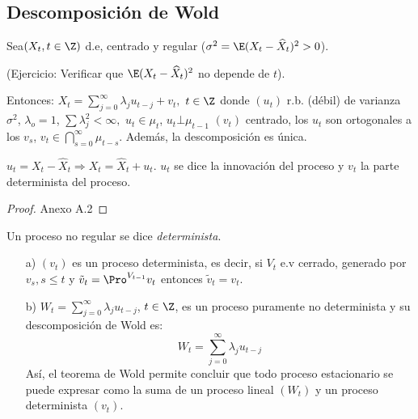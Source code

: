 \subsection{Descomposici\'{o}n de Wold}
\label{subsubsec:mylabel4}

\begin{teorema}
Sea$(X_{t} ,t\in \Z)$ d.e, centrado y regular ($ {\sigma^{2}=\E( {X_{t} -\widehat{{X}}_{t} } )^{2}>0} $).\newline

(Ejercicio: Verificar que $\E( {X_{t} -\widehat{{X}}_{t} } )^{2}$ no depende de $t$).\newline 

Entonces: $\displaystyle X_{t} =\sum_{j=0}^\infty {\lambda_{j} u_{t-j} +v_{t} },$ $t\in \Z$
donde $(u_{t} )$ r.b. (d\'{e}bil) de varianza $\sigma^{2}$, $\lambda_{o} =1$, $\sum {\lambda_{j}^{2} <\infty },$ $u_{t} \in \mu_{t}$, $u_{t} \bot \mu_{t-1}$ $(v_{t})$ centrado, los $u_{t}$ son ortogonales a los $v_{s}$, $\displaystyle v_{t} \in \bigcap_{s=0}^{\infty } \mu_{t-s} $. Adem\'{a}s, la descomposici\'{o}n es \'{u}nica.
\end{teorema}

\begin{observacion}
$u_{t} =X_{t} -\widehat{{X}}_{t} \Rightarrow X_{t} =\widehat{{X}}_{t} +u_{t}.$ $ u_{t} $ se dice la innovaci\'{o}n del proceso y $v_{t}$ la parte determinista del proceso.
\end{observacion}

\begin{proof}
 Anexo A.2
\end{proof}

\begin{definicion}
 Un proceso no regular se dice \emph{determinista}.
\end{definicion}

\begin{ejercicio}
\quad
 \begin{enumerate}
  \item[a)] $(v_{t})$ es un proceso determinista, es decir, si $V_{t}$ e.v cerrado, generado por $v_{s}, s\leq t$ y $\tilde{v}_{t}=\Pro^{V_{t-1}} {v}_{t}$ entonces $\tilde{{v}}_{t} =v_{t} $.

  \item[b)] $\displaystyle W_{t} =\sum_{j=0}^\infty \lambda_{j} u_{t-j}$, $t\in\Z$, es un proceso puramente no determinista y su descomposici\'{o}n de Wold es: 
  \[
    W_{t} =\sum_{j=0}^\infty {\lambda_{j} u_{t-j} } 
  \]
	As\'{i}, el teorema de Wold permite concluir que todo proceso estacionario se puede expresar como la suma de un proceso lineal $(W_{t})$ y un proceso determinista $(v_{t})$.
 \end{enumerate}

\end{ejercicio}


